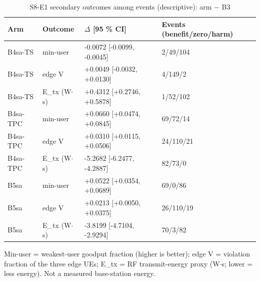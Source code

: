 \begin{table}[t]\centering\caption{S8-E1 secondary outcomes among events (descriptive): arm $-$ B3}\label{tab:t5}\footnotesize
\begin{tabular}{llll}\toprule
Arm & Outcome & $\Delta$ [95 \% CI] & Events (benefit/zero/harm) \\\midrule
B4sa-TS & min-user & -0.0072 [-0.0099, -0.0045] & 2/49/104 \\
B4sa-TS & edge V & +0.0049 [-0.0032, +0.0130] & 4/149/2 \\
B4sa-TS & E\_tx (W$\cdot$s) & +0.4312 [+0.2746, +0.5878] & 1/52/102 \\
B4sa-TPC & min-user & +0.0660 [+0.0474, +0.0845] & 69/72/14 \\
B4sa-TPC & edge V & +0.0310 [+0.0115, +0.0506] & 24/110/21 \\
B4sa-TPC & E\_tx (W$\cdot$s) & -5.2682 [-6.2477, -4.2887] & 82/73/0 \\
B5sa & min-user & +0.0522 [+0.0354, +0.0689] & 69/0/86 \\
B5sa & edge V & +0.0213 [+0.0050, +0.0375] & 26/110/19 \\
B5sa & E\_tx (W$\cdot$s) & -3.8199 [-4.7104, -2.9294] & 70/3/82 \\
\bottomrule\end{tabular}
\par\smallskip\parbox{\linewidth}{\scriptsize Min-user = weakest-user goodput fraction (higher is better); edge V = violation fraction of the three edge UEs; E\_tx = RF transmit-energy proxy (W$\cdot$s; lower = less energy). Not a measured base-station energy.}\end{table}

